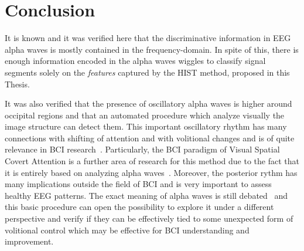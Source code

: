 \section{Conclusion}

It is known and it was verified here that the discriminative information in EEG alpha waves is mostly contained in the frequency-domain.  In spite of this,  there is enough information encoded in the alpha waves wiggles to classify signal segments solely on the \textit{features} captured by the HIST method, proposed in this Thesis.  

It was also verified that the presence of oscillatory alpha waves is higher around occipital regions and that an automated procedure which analyze visually the image structure can detect them. This important oscillatory rhythm has many connections with shifting of attention and with volitional changes and is of quite relevance in BCI research~\cite{Basar2012}.  Particularly, the BCI paradigm of Visual Spatial Covert Attention is a further area of research for this method due to the fact that it is entirely based on analyzing alpha waves~\cite{vanGerven2009}. Moreover, the posterior rythm has many implications outside the field of BCI and is very important to assess healthy EEG patterns. The exact meaning of alpha waves is still debated~\cite{Ahn2013} and this basic procedure can open the possibility to explore it under a different perspective and verify if they can be effectively tied to some unexpected form of volitional control which may be effective for BCI understanding and improvement.

%





